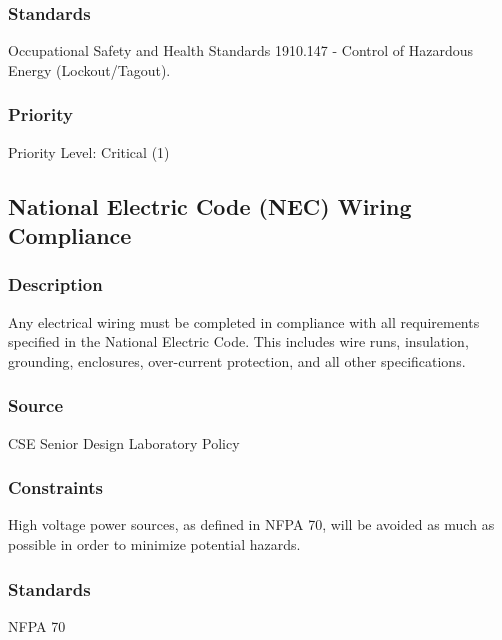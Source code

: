 \subsubsection{Standards}
Occupational Safety and Health Standards 1910.147 - Control of Hazardous Energy (Lockout/Tagout).

\subsubsection{Priority}
Priority Level: Critical (1)



\subsection{National Electric Code (NEC) Wiring Compliance}
\subsubsection{Description}
Any electrical wiring must be completed in compliance with all requirements specified in the National Electric Code. This includes wire runs, insulation, grounding, enclosures, over-current protection, and all other specifications.

\subsubsection{Source}
CSE Senior Design Laboratory Policy

\subsubsection{Constraints}
High voltage power sources, as defined in NFPA 70, will be avoided as much as possible in order to minimize potential hazards.

\subsubsection{Standards}
NFPA 70

